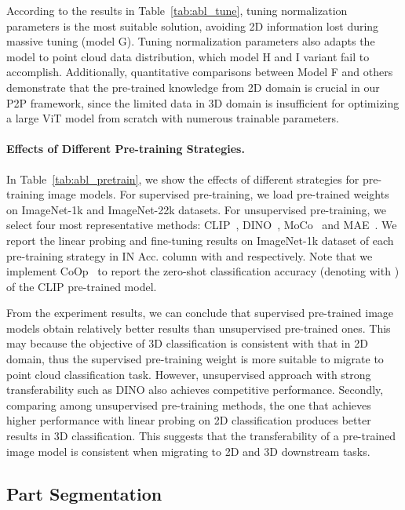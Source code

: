 \documentclass{article}
\begin{document}
According to the results in Table~\ref{tab:abl_tune}, tuning normalization parameters is the most suitable solution, avoiding 2D information lost during massive tuning (model G). Tuning normalization parameters also adapts the model to point cloud data distribution, which model H and I variant fail to accomplish. Additionally, quantitative comparisons between Model F and others demonstrate that the pre-trained knowledge from 2D domain is crucial in our P2P framework, since the limited data in 3D domain is insufficient for optimizing a large ViT model from scratch with numerous trainable parameters. 

\paragraph{Effects of Different Pre-training Strategies.}

In Table~\ref{tab:abl_pretrain}, we show the effects of different strategies for pre-training image models. For supervised pre-training, we load pre-trained weights on ImageNet-1k and ImageNet-22k datasets. For unsupervised pre-training, we select four most representative methods: CLIP~\cite{radford2021clip}, DINO~\cite{caron2021dino}, MoCo~\cite{chen2021mocov3} and MAE~\cite{he2022masked}. We report the linear probing and fine-tuning results on ImageNet-1k dataset of each pre-training strategy in IN Acc. column with  and  respectively. Note that we implement CoOp~\cite{zhou2021coop} to report the zero-shot classification accuracy (denoting with ) of the CLIP pre-trained model.

From the experiment results, we can conclude that supervised pre-trained image models obtain relatively better results than unsupervised pre-trained ones. This may because the objective of 3D classification is consistent with that in 2D domain, thus the supervised pre-training weight is more suitable to migrate to point cloud classification task. However, unsupervised approach with strong transferability such as DINO also achieves competitive performance.
Secondly, comparing among unsupervised pre-training methods, the one that achieves higher performance with linear probing on 2D classification produces better results in 3D classification. This suggests that the transferability of a pre-trained image model is consistent when migrating to 2D and 3D downstream tasks.

\subsection{Part Segmentation}
\label{sec:seg}
\end{document}
